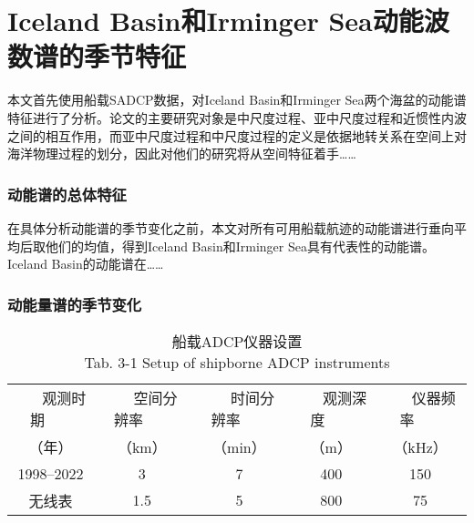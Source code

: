 \chapter{Iceland Basin和Irminger Sea动能波数谱的季节特征}

本文首先使用船载SADCP数据，对Iceland Basin和Irminger Sea两个海盆的动能谱特征进行了分析。论文的主要研究对象是中尺度过程、亚中尺度过程和近惯性内波之间的相互作用，而亚中尺度过程和中尺度过程的定义是依据地转关系在空间上对海洋物理过程的划分，因此对他们的研究将从空间特征着手……

\subsection{动能谱的总体特征}

在具体分析动能谱的季节变化之前，本文对所有可用船载航迹的动能谱进行垂向平均后取他们的均值，得到Iceland Basin和Irminger Sea具有代表性的动能谱。Iceland Basin的动能谱在……

\subsection{动能量谱的季节变化}

\begin{table}[htb]
  \centering\small
  \caption{船载ADCP仪器设置\\
  Tab. 3-1 Setup of shipborne ADCP instruments}
  \label{tab:exampletable}
  \begin{tabular}{ccccc}
    \hline\toprule
    ~~~ 观测时期 ~~~   & ~~~ 空间分辨率 ~~~  & ~~~ 时间分辨率 ~~~  & ~~~ 观测深度 ~~~ & ~~~ 仪器频率 ~~~  \\
    （年） & （km） & （min） & （m） & （kHz）  \\
    \midrule
    1998--2022 & 3 & 7 & 400 & 150 \\
    无线表 & 1.5 & 5 & 800 & 75   \\
    \bottomrule\hline
  \end{tabular}
\end{table}

